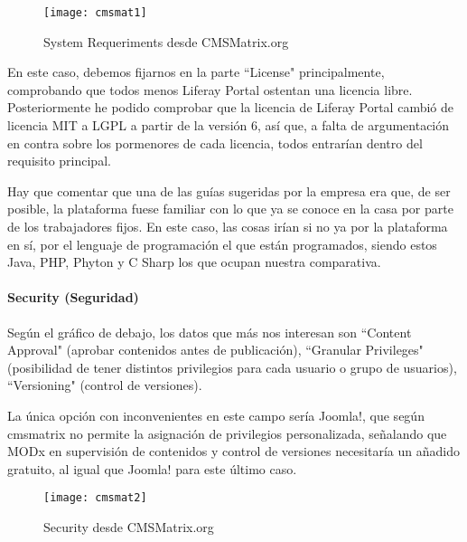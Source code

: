 \begin{figure}
\begin{narrow}{-0.15\linewidth}{-0.15\linewidth}
\centering
\texttt{[image: cmsmat1]}
\caption{System Requeriments desde CMSMatrix.org}
\end{narrow}
\label{fig:cmsmat1}
\end{figure}

\par En este caso, debemos fijarnos en la parte ``License" principalmente, comprobando que todos menos Liferay Portal ostentan una licencia libre. Posteriormente he podido comprobar que la licencia de Liferay Portal cambió de licencia MIT a LGPL a partir de la versión 6\cite{references:liferaylicense}, así que, a falta de argumentación en contra sobre los pormenores de cada licencia, todos entrarían dentro del requisito principal.

\par Hay que comentar que una de las guías sugeridas por la empresa era que, de ser posible, la plataforma fuese familiar con lo que ya se conoce en la casa por parte de los trabajadores fijos. En este caso, las cosas irían si no ya por la plataforma en sí, por el lenguaje de programación el que están programados, siendo estos Java, PHP, Phyton y C Sharp los que ocupan nuestra comparativa.

\paragraph{Security (Seguridad)}

\par Según el gráfico de debajo, los datos que más nos interesan son ``Content Approval" (aprobar contenidos antes de publicación), ``Granular Privileges" (posibilidad de tener distintos privilegios para cada usuario o grupo de usuarios), ``Versioning" (control de versiones).

\par La única opción con inconvenientes en este campo sería Joomla!, que según cmsmatrix no permite la asignación de privilegios personalizada, señalando que MODx en supervisión de contenidos y control de versiones necesitaría un añadido gratuito, al igual que Joomla! para este último caso.

\begin{figure}
\begin{narrow}{-0.15\linewidth}{-0.15\linewidth}
\centering
\texttt{[image: cmsmat2]}
\caption{Security desde CMSMatrix.org}
\end{narrow}
\label{fig:cmsmat2}
\end{figure}


